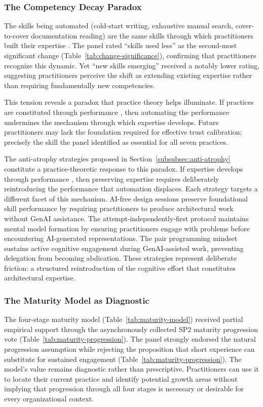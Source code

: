 \subsubsection{The Competency Decay Paradox}

The skills being automated (cold-start writing, exhaustive manual search,
cover-to-cover documentation reading) are the same skills through which
practitioners built their expertise
\parencite{kabashkin_cognitive_atrophy_2025}. The panel rated ``skills used less'' as the second-most significant change
(Table~\ref{tab:change-significance}), confirming that practitioners recognize
this dynamic. Yet ``new skills emerging'' received a notably lower rating,
suggesting practitioners perceive the shift as extending existing expertise
rather than requiring fundamentally new competencies.

This tension reveals a paradox that practice theory helps illuminate. If
practices are constituted through performance
\parencite{feldman_theorizing_2011}, then automating the performance
undermines the mechanism through which expertise develops. Future practitioners
may lack the foundation required for effective trust calibration; precisely
the skill the panel identified as essential for all seven practices.

The anti-atrophy strategies proposed in
Section~\ref{subsubsec:anti-atrophy} constitute a practice-theoretic response
to this paradox. If expertise develops through performance
\parencite{feldman_theorizing_2011}, then preserving expertise requires
deliberately reintroducing the performance that automation displaces. Each
strategy targets a different facet of this mechanism. AI-free design sessions
preserve foundational skill performance by requiring practitioners to produce
architectural work without GenAI assistance. The attempt-independently-first
protocol maintains mental model formation by ensuring practitioners engage with
problems before encountering AI-generated representations. The pair programming
mindset sustains active cognitive engagement during GenAI-assisted work,
preventing delegation from becoming abdication. These strategies
represent deliberate friction: a structured reintroduction of the cognitive
effort that constitutes architectural expertise.

\subsubsection{The Maturity Model as Diagnostic}

The four-stage maturity model (Table~\ref{tab:maturity-model}) received partial
empirical support through the asynchronously collected SP2 maturity progression
vote (Table~\ref{tab:maturity-progression}). The panel strongly endorsed the natural progression assumption while rejecting
the proposition that short experience can substitute for sustained engagement
(Table~\ref{tab:maturity-progression}). The model's value remains diagnostic rather than prescriptive. Practitioners can
use it to locate their current practice and identify potential growth areas
without implying that progression through all four stages is necessary or
desirable for every organizational context.

